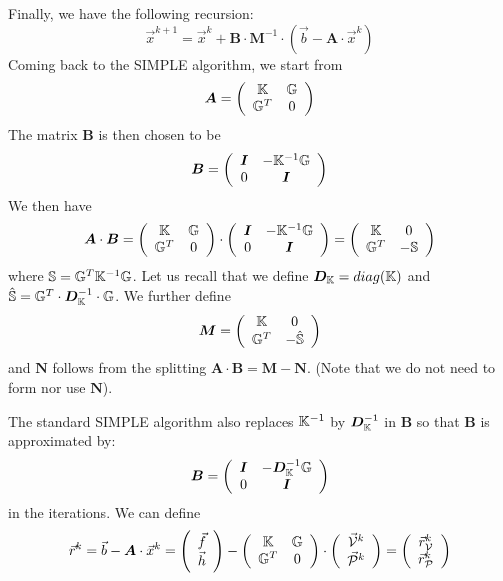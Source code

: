Finally, we have the following recursion:
\begin{equation}
\boxed{\vec{x}^{k+1} = \vec{x}^k +{\bm B} \cdot {\bm M} ^{-1}\cdot (\vec{b} -{\bm A}\cdot \vec{x}^{k}  ) }
\label{eq:simplerec}
\end{equation}
Coming back to the SIMPLE algorithm, we start from 
\[
{\bm A}=
\left(
\begin{array}{cc}
{\mathbb{K}} & {\mathbb{G}} \\
{\mathbb{G}}^T & 0
\end{array}
\right)
\]
The matrix ${\bm B}$ is then chosen to be 
\[
{\bm B}=
\left(
\begin{array}{cc}
{\bm I} & -{\mathbb{K}}^{-1} {\mathbb{G}} \\
0 & {\bm I}
\end{array}
\right)
\]
We then have 
\[
{\bm A}\cdot  {\bm B} = 
\left(
\begin{array}{cc}
{\mathbb{K}} & {\mathbb{G}} \\
{\mathbb{G}}^T & 0
\end{array}
\right)
\cdot 
\left(
\begin{array}{cc}
{\bm I} & -{\mathbb{K}}^{-1} {\mathbb{G}} \\
0 & {\bm I}
\end{array}
\right)
=
\left(
\begin{array}{cc}
{\mathbb{K}} & 0 \\
{\mathbb{G}}^T & -{\mathbb{S}}
\end{array}
\right)
\]
where ${\mathbb{S}}={\mathbb{G}}^T{\mathbb{K}}^{-1}{\mathbb{G}}$.
Let us recall that we define ${\bm D}_{\mathbb{K}} =diag({\mathbb{K}})$ and $\hat{{\mathbb{S}}}={\mathbb{G}}^T \cdot {\bm D}_{\mathbb{K}}^{-1} \cdot {\mathbb{G}}$. 
We further define 
\[
{\bm M}=
\left(
\begin{array}{cc}
{\mathbb{K}} & 0 \\
{\mathbb{G}}^T & -\hat{{\mathbb{S}}}
\end{array}
\right)
\]
and ${\bm N}$ follows from the splitting ${\bm A}\cdot {\bm B}= {\bm M} - {\bm N}$. 
(Note that we do not need to form nor use ${\bm N}$).

The standard SIMPLE algorithm also replaces ${\mathbb{K}}^{-1}$  by  ${\bm D}_{\mathbb{K}}^{-1}$ in ${\bm B}$ so that 
${\bm B}$ is approximated by:
\[
{\bm B}=
\left(
\begin{array}{cc}
{\bm I} & -{\bm D}_{\mathbb{K}}^{-1} {\mathbb{G}} \\
0 & {\bm I}
\end{array}
\right)
\]
in the iterations.
We can define 
\[
\vec{r}^k=
\vec{b}-{\bm A}\cdot \vec{x}^k = 
\left(
\begin{array}{c}
\vec{f} \\ \vec{h}
\end{array}
\right)
-
\left(
\begin{array}{cc}
{\mathbb{K}} & {\mathbb{G}} \\
{\mathbb{G}}^T & 0
\end{array}
\right)
\cdot
\left(
\begin{array}{c}
\vec{\cal V}^k \\ \vec{\cal P}^k
\end{array}
\right)
=
\left(
\begin{array}{c}
\vec{r}_{\cal V}^k \\ \vec{r}_{\cal P}^k
\end{array}
\right)
\]

